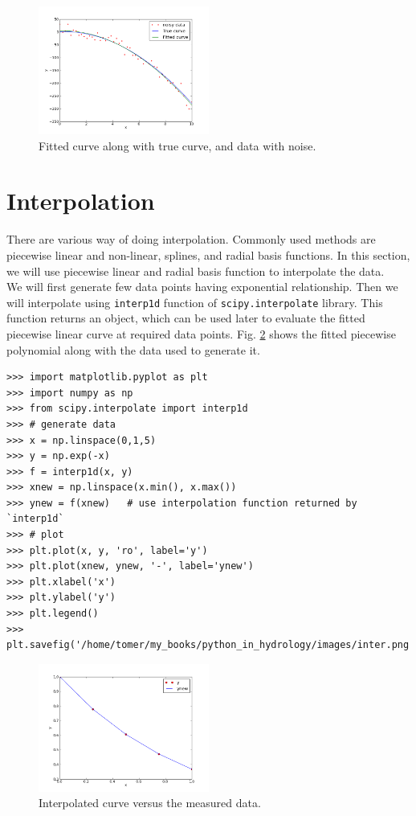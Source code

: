 \documentclass[10pt]{book}
\begin{document}
{\beforefig
\begin{figure}[h!]
  \centering
    \includegraphics[width=0.5\textwidth]{images/curve_regre.png}
  \caption{Fitted curve along with true curve, and data with noise.}
   \label{fig:curve}
\end{figure}
\afterfig

\section{Interpolation}
There are various way of doing interpolation. Commonly used methods are piecewise linear and non-linear, splines, and radial basis functions. In this section, we will use piecewise linear and radial basis function to interpolate the data.\\

 We will first generate few data points having exponential relationship. Then we will interpolate using \verb"interp1d" function of \verb"scipy.interpolate" library. This function returns an object, which can be used later to evaluate the fitted piecewise linear curve at required data points. Fig. \ref{fig:interp1d} shows the fitted piecewise polynomial along with the data used to generate it.
\beforeverb \begin{verbatim}
>>> import matplotlib.pyplot as plt
>>> import numpy as np
>>> from scipy.interpolate import interp1d
>>> # generate data
>>> x = np.linspace(0,1,5)
>>> y = np.exp(-x)
>>> f = interp1d(x, y)
>>> xnew = np.linspace(x.min(), x.max())
>>> ynew = f(xnew)   # use interpolation function returned by `interp1d`
>>> # plot
>>> plt.plot(x, y, 'ro', label='y')
>>> plt.plot(xnew, ynew, '-', label='ynew')
>>> plt.xlabel('x')
>>> plt.ylabel('y')
>>> plt.legend()
>>> plt.savefig('/home/tomer/my_books/python_in_hydrology/images/inter.png')
\end{verbatim} \afterverb

\beforefig
\begin{figure}[h!]
  \centering
    \includegraphics[width=0.5\textwidth]{images/inter.png}
  \caption{Interpolated curve versus the measured data.}
   \label{fig:interp1d}
\end{figure}
\afterfig

}
\end{document}
